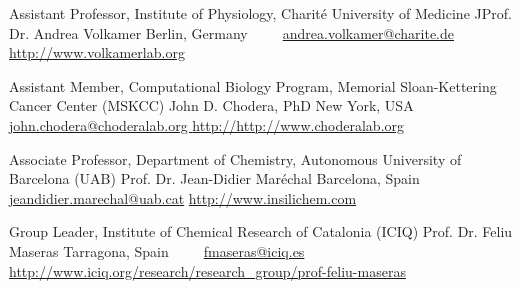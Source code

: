 


\begin{cventries}

    \cventry
        {Assistant Professor, Institute of Physiology, Charité University of Medicine}
        {JProf. Dr. Andrea Volkamer}
        {Berlin, Germany} %
        {~} %
        {~~ \footnotesize{%
            \href{mailto:andrea.volkamer@charite.de}{\faEnvelope\acvHeaderIconSep andrea.volkamer@charite.de}\acvHeaderSocialSep%
            \href{http://www.volkamerlab.org}{\faGlobe\acvHeaderIconSep http://www.volkamerlab.org}%
        }}

    \cventry
        {Assistant Member, Computational Biology Program, Memorial Sloan-Kettering Cancer Center (MSKCC)}
        {John D. Chodera, PhD}
        {New York, USA} %
        {~} %
        {~~ \footnotesize{%
            \href{mailto:john.chodera@choderalab.org }{\faEnvelope\acvHeaderIconSep john.chodera@choderalab.org }\acvHeaderSocialSep%
            \href{http://http://www.choderalab.org}{\faGlobe\acvHeaderIconSep http://http://www.choderalab.org}%
        }}

    \cventry
        {Associate Professor, Department of Chemistry, Autonomous University of Barcelona (UAB)}
        {Prof. Dr. Jean-Didier Maréchal}
        {Barcelona, Spain} %
        {~} %
        {~~ \footnotesize{%
            \href{mailto:jeandidier.marechal@uab.cat}{\faEnvelope\acvHeaderIconSep jeandidier.marechal@uab.cat}\acvHeaderSocialSep%
            \href{http://www.insilichem.com}{\faGlobe\acvHeaderIconSep http://www.insilichem.com}%
        }}

    \cventry
        {Group Leader, Institute of Chemical Research of Catalonia (ICIQ)}
        {Prof. Dr. Feliu Maseras}
        {Tarragona, Spain} %
        {~} %
        {~~ \footnotesize{%
            \href{mailto:fmaseras@iciq.es}{\faEnvelope\acvHeaderIconSep fmaseras@iciq.es}\acvHeaderSocialSep%
            \href{http://www.iciq.org/research/research_group/prof-feliu-maseras/}{\faGlobe\acvHeaderIconSep http://www.iciq.org/research/research\_group/prof-feliu-maseras}
        }}

\end{cventries}
